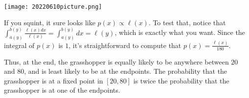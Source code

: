 \documentclass[11pt]{article}
\theoremstyle{definition}
\begin{document}
\texttt{[image: 20220610picture.png]}

If you squint, it sure looks like $p(x) \propto \ell(x)$.  To test that, notice that $\displaystyle{\int_{a(y)}^{b(y)} \frac{\ell(x)dx}{\ell(x)}} = \int_{a(y)}^{b(y)} dx = \ell(y)$, which is exactly what you want.  Since the integral of $p(x)$ is $1$, it's straightforward to compute that $p(x) = \frac{\ell(x)}{180}$.

Thus, at the end, the grasshopper is equally likely to be anywhere between $20$ and $80$, and is least likely to be at the endpoints.  The probability that the grasshopper is at a fixed point in $[20, 80]$ is twice the probability that the grasshopper is at one of the endpoints.
\end{document}

